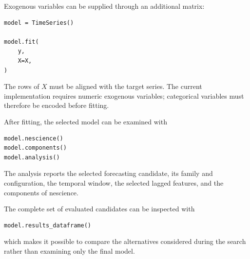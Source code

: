 Exogenous variables can be supplied through an additional matrix:

\begin{sourcecode}
{\scriptsize
\begin{verbatim}
model = TimeSeries()

model.fit(
    y,
    X=X,
)
\end{verbatim}}
\end{sourcecode}

The rows of \(X\) must be aligned with the target series. The current
implementation requires numeric exogenous variables; categorical variables must
therefore be encoded before fitting.

After fitting, the selected model can be examined with

\begin{sourcecode}
{\scriptsize
\begin{verbatim}
model.nescience()
model.components()
model.analysis()
\end{verbatim}}
\end{sourcecode}

The analysis reports the selected forecasting candidate, its family and
configuration, the temporal window, the selected lagged features, and the
components of nescience.

The complete set of evaluated candidates can be inspected with

\begin{sourcecode}
{\scriptsize
\begin{verbatim}
model.results_dataframe()
\end{verbatim}}
\end{sourcecode}

which makes it possible to compare the alternatives considered during the
search rather than examining only the final model.

